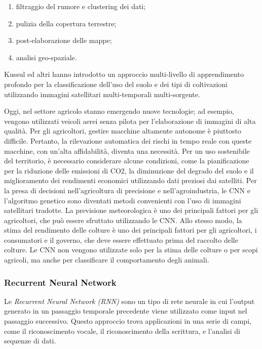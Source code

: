 \begin{enumerate}
    \item filtraggio del rumore e clustering dei dati;
    \item pulizia della copertura terrestre;
    \item post-elaborazione delle mappe;
    \item analisi geo-spaziale.
\end{enumerate}

Kussul ed altri hanno introdotto un approccio multi-livello di apprendimento profondo per la classificazione dell'uso del suolo e dei tipi di coltivazioni utilizzando immagini satellitari multi-temporali multi-sorgente.

Oggi, nel settore agricolo stanno emergendo nuove tecnologie; ad esempio, vengono utilizzati veicoli aerei senza pilota per l'elaborazione di immagini di alta qualità. Per gli agricoltori, gestire macchine altamente autonome è piuttosto difficile. Pertanto, la rilevazione automatica dei rischi in tempo reale con queste macchine, con un'alta affidabilità, diventa una necessità. Per un uso sostenibile del territorio, è necessario considerare alcune condizioni, come la pianificazione per la riduzione delle emissioni di CO2, la diminuzione del degrado del suolo e il miglioramento dei rendimenti economici utilizzando dati preziosi dai satelliti. Per la presa di decisioni nell'agricoltura di precisione e nell'agroindustria, le CNN e l'algoritmo genetico sono diventati metodi convenienti con l'uso di immagini satellitari tradotte. La previsione meteorologica è uno dei principali fattori per gli agricoltori, che può essere sfruttato utilizzando le CNN. Allo stesso modo, la stima del rendimento delle colture è uno dei principali fattori per gli agricoltori, i consumatori e il governo, che deve essere effettuato prima del raccolto delle colture. Le CNN non vengono utilizzate solo per la stima delle colture o per scopi agricoli, ma anche per classificare il comportamento degli animali.

\subsubsection{Recurrent Neural Network}

Le \textit{Recurrent Neural Network (RNN)} sono un tipo di rete neurale in cui l'output generato in un passaggio temporale precedente viene utilizzato come input nel passaggio successivo. Questo approccio trova applicazioni in una serie di campi, come il riconoscimento vocale, il riconoscimento della scrittura, e l'analisi di sequenze di dati.

